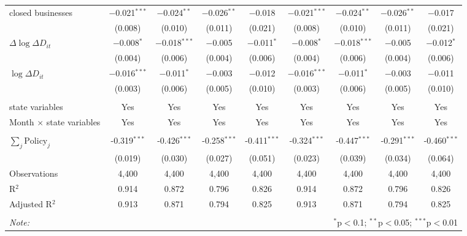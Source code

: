 \begin{tabular}{@{\extracolsep{1pt}}lcccccccc}
  closed businesses & $-$0.021$^{***}$ & $-$0.024$^{**}$ & $-$0.026$^{**}$ & $-$0.018 & $-$0.021$^{***}$ & $-$0.024$^{**}$ & $-$0.026$^{**}$ & $-$0.017 \\ 
  & (0.008) & (0.010) & (0.011) & (0.021) & (0.008) & (0.010) & (0.011) & (0.021) \\ 
  $\Delta \log \Delta D_{it}$ & $-$0.008$^{*}$ & $-$0.018$^{***}$ & $-$0.005 & $-$0.011$^{*}$ & $-$0.008$^{*}$ & $-$0.018$^{***}$ & $-$0.005 & $-$0.012$^{*}$ \\ 
  & (0.004) & (0.006) & (0.004) & (0.006) & (0.004) & (0.006) & (0.004) & (0.006) \\ 
  $\log \Delta D_{it}$ & $-$0.016$^{***}$ & $-$0.011$^{*}$ & $-$0.003 & $-$0.012 & $-$0.016$^{***}$ & $-$0.011$^{*}$ & $-$0.003 & $-$0.011 \\ 
  & (0.003) & (0.006) & (0.005) & (0.010) & (0.003) & (0.006) & (0.005) & (0.010) \\ 
 \hline \\[-1.8ex] 
state variables & Yes & Yes & Yes & Yes & Yes & Yes & Yes & Yes \\ 
Month $\times$ state variables & Yes & Yes & Yes & Yes & Yes & Yes & Yes & Yes \\ 
\hline \\[-1.8ex] 
$\sum_j \mathrm{Policy}_j$ & -0.319$^{***}$ & -0.426$^{***}$ & -0.258$^{***}$ & -0.411$^{***}$ & -0.324$^{***}$ & -0.447$^{***}$ & -0.291$^{***}$ & -0.460$^{***}$ \\ 
 & (0.019) & (0.030) & (0.027) & (0.051) & (0.023) & (0.039) & (0.034) & (0.064) \\ 
Observations & 4,400 & 4,400 & 4,400 & 4,400 & 4,400 & 4,400 & 4,400 & 4,400 \\ 
R$^{2}$ & 0.914 & 0.872 & 0.796 & 0.826 & 0.914 & 0.872 & 0.796 & 0.826 \\ 
Adjusted R$^{2}$ & 0.913 & 0.871 & 0.794 & 0.825 & 0.913 & 0.871 & 0.794 & 0.825 \\ 
\hline 
\hline \\[-1.8ex] 
\textit{Note:}  & \multicolumn{8}{r}{$^{*}$p$<$0.1; $^{**}$p$<$0.05; $^{***}$p$<$0.01} \\ 
\end{tabular} 